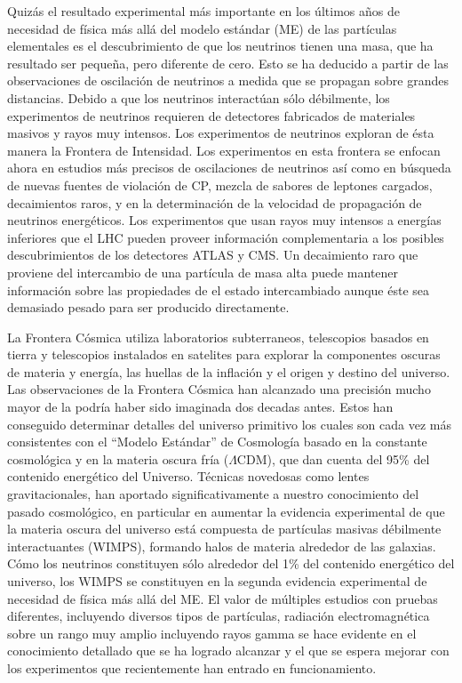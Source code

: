 Quizás el resultado experimental más importante en los últimos años de
necesidad de física más allá del modelo estándar (ME) de las partículas
elementales es el descubrimiento de que los neutrinos tienen una masa,
que ha resultado ser pequeña, pero diferente de cero. Esto se ha
deducido a partir de las observaciones de oscilación de neutrinos a
medida que se propagan sobre grandes distancias. Debido a que los
neutrinos interactúan sólo débilmente, los experimentos de neutrinos
requieren de detectores fabricados de materiales masivos y rayos muy
intensos. Los experimentos de neutrinos exploran de ésta manera la
Frontera de Intensidad. Los experimentos en esta frontera se enfocan
ahora en estudios más precisos de oscilaciones de neutrinos así como
en búsqueda de nuevas fuentes de violación de CP, mezcla de sabores de
leptones cargados, decaimientos raros, y en la determinación de la
velocidad de propagación de neutrinos energéticos. Los experimentos
que usan rayos muy intensos a energías inferiores que el LHC pueden
proveer información complementaria a los posibles descubrimientos de
los detectores ATLAS y CMS. Un decaimiento raro que proviene del
intercambio de una partícula de masa alta puede mantener información
sobre las propiedades de el estado intercambiado aunque éste sea
demasiado pesado para ser producido directamente.

La Frontera Cósmica utiliza laboratorios subterraneos, telescopios
basados en tierra y telescopios instalados en satelites para explorar
la componentes oscuras de materia y energía, las huellas de la
inflación y el origen y destino del universo. Las observaciones de la
Frontera Cósmica han alcanzado una precisión mucho mayor de la podría
haber sido imaginada dos decadas antes. Estos han conseguido
determinar detalles del universo primitivo los cuales son cada vez más
consistentes con el ``Modelo Estándar'' de Cosmología basado en la
constante cosmológica y en la materia oscura fría ($\Lambda$CDM), que
dan cuenta del 95\% del contenido energético del Universo. Técnicas
novedosas como lentes gravitacionales, han aportado significativamente
a nuestro conocimiento del pasado cosmológico, en particular en
aumentar la evidencia experimental de que la materia oscura del universo
está compuesta de partículas masivas débilmente interactuantes (WIMPS),
formando halos de materia alrededor de las galaxias. Cómo los 
neutrinos constituyen sólo alrededor del 1\% del contenido energético
del universo, los WIMPS se constituyen en la segunda evidencia
experimental de necesidad de física más allá del ME.  El valor de múltiples
estudios con pruebas diferentes, incluyendo diversos tipos de
partículas, radiación electromagnética sobre un rango muy amplio
incluyendo rayos gamma se hace evidente en el conocimiento detallado
que se ha logrado alcanzar y el que se espera mejorar con los
experimentos que recientemente han entrado en funcionamiento.

